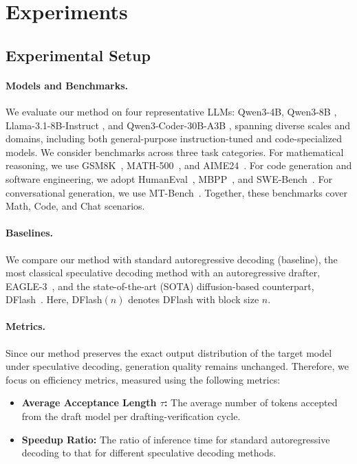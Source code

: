 \documentclass{llmxive}
\begin{document}
\section{Experiments}
\label{Experiments}
\subsection{Experimental Setup}
\paragraph{Models and Benchmarks.}
We evaluate our method on four representative LLMs: Qwen3-4B, Qwen3-8B \cite{yang2025qwen3}, Llama-3.1-8B-Instruct \cite{grattafiori2024llama}, and Qwen3-Coder-30B-A3B \cite{cao2026qwen3}, spanning diverse scales and domains, including both general-purpose instruction-tuned and code-specialized models. We consider benchmarks across three task categories. For mathematical reasoning, we use GSM8K~\citep{cobbe2021training}, MATH-500~\citep{lightman2023let}, and AIME24~\citep{AIME}. For code generation and software engineering, we adopt HumanEval~\citep{chen2021evaluating}, MBPP~\citep{austin2021program}, and SWE-Bench~\citep{jimenez2023swe}. For conversational generation, we use MT-Bench~\citep{zheng2023judging}. Together, these benchmarks cover Math, Code, and Chat scenarios.

\paragraph{Baselines.}
We compare our method with standard autoregressive decoding (baseline), the most classical speculative decoding method with an autoregressive drafter, EAGLE-3~\citep{li2025eagle3scalinginferenceacceleration}, and the state-of-the-art (SOTA) diffusion-based counterpart, DFlash~\citep{chen2026dflash}. Here, DFlash$(n)$ denotes DFlash with block size $n$.

\paragraph{Metrics.}
Since our method preserves the exact output distribution of the target model under speculative decoding, generation quality remains unchanged. Therefore, we focus on efficiency metrics, measured using the following metrics:
\begin{itemize}[leftmargin=*]
    \item \textbf{Average Acceptance Length $\tau$:} The average number of tokens accepted from the draft model per drafting-verification cycle.
    \item \textbf{Speedup Ratio:} The ratio of inference time for standard autoregressive decoding to that for different speculative decoding methods.
\end{itemize}
\end{document}
